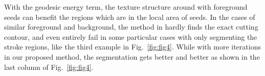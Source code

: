 \documentclass{article}
\begin{document}
With the geodesic energy term, the texture structure around with foreground seeds can benefit the regions which are in the local area of seeds. In the cases of similar foreground and background, the method in \cite{nguyen2012robust} hardly finds the exact cutting contour, and even entirely fail in some particular cases with only segmenting the stroke regions, like the third example in Fig.~\ref{fig:fig4}. While with more iterations in our proposed method, the segmentation gets better and better as shown in the last column of Fig.~\ref{fig:fig4}.
\begin{figure}[!htb]
\begin{center}
\vspace{-1mm}
\end{center}
\end{figure}
\end{document}
